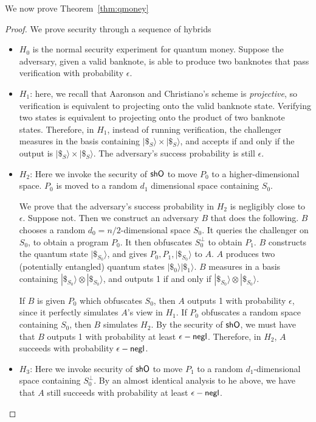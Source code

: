 \noindent We now prove Theorem~\ref{thm:qmoney}

\begin{proof} We prove security through a sequence of hybrids
\begin{itemize}
	\item $H_0$ is the normal security experiment for quantum money.  Suppose the adversary, given a valid banknote, is able to produce two banknotes that pass verification with probability $\epsilon$.
	\item $H_1$: here, we recall that Aaronson and Christiano's scheme is \emph{projective}, so verification is equivalent to projecting onto the valid banknote state.  Verifying two states is equivalent to projecting onto the product of two banknote states.  Therefore, in $H_1$, instead of running verification, the challenger measures in the basis containing $|\$_S\rangle\times|\$_S\rangle$, and accepts if and only if the output is $|\$_S\rangle\times|\$_S\rangle$.  The adversary's success probability is still $\epsilon$.
	\item $H_2$: Here we invoke the security of ${\sf shO}$ to move $P_0$ to a higher-dimensional space.  $P_0$ is moved to a random $d_1$ dimensional space containing $S_0$.
	
	We prove that the adversary's success probability in $H_2$ is negligibly close to $\epsilon$.  Suppose not.  Then we construct an adversary $B$ that does the following.  $B$ chooses a random $d_0=n/2$-dimensional space $S_0$.  It queries the challenger on $S_0$, to obtain a program $P_0$.  It then obfuscates $S_0^\bot$ to obtain $P_1$.  $B$ constructs the quantum state $|\$_{S_0}\rangle$, and gives $P_0,P_1,|\$_{S_0}\rangle$ to $A$.  $A$ produces two (potentially entangled) quantum states $|\$_0\rangle|\$_1\rangle$.  $B$ measures in a basis containing $|\$_{S_0}\rangle\otimes|\$_{S_0}\rangle$, and outputs 1 if and only if $|\$_{S_0}\rangle\otimes|\$_{S_0}\rangle$.
	
	If $B$ is given $P_0$ which obfuscates $S_0$, then $A$ outputs 1 with probability $\epsilon$, since it perfectly simulates $A$'s view in $H_1$.  If $P_0$ obfuscates a random space containing $S_0$, then $B$ simulates $H_2$.  By the security of ${\sf shO}$, we must have that $B$ outputs 1 with probability at least $\epsilon-{\sf negl}$.  Therefore, in $H_2$, $A$ succeeds with probability $\epsilon-{\sf negl}$.
	
	\item $H_3$: Here we invoke security of ${\sf shO}$ to move $P_1$ to a random $d_1$-dimensional space containing $S_0^\bot$.  By an almost identical analysis to he above, we have that $A$ still succeeds with probability at least $\epsilon-{\sf negl}$.
	

\end{itemize}
\end{proof}
